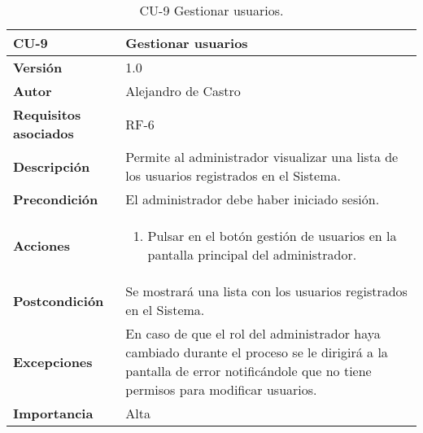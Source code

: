 \begin{table}[p]
	\centering
	\begin{tabularx}{\linewidth}{ p{} p{} }
		\toprule
		\textbf{CU-9}    & \textbf{Gestionar usuarios}\\
		\toprule
		\textbf{Versión}              & 1.0    \\
		\textbf{Autor}                & {Alejandro de Castro} \\
		\textbf{Requisitos asociados} & RF-6 \\
		\textbf{Descripción}          & Permite al administrador visualizar una lista de los usuarios registrados en el Sistema. \\
		\textbf{Precondición}         & El administrador debe haber iniciado sesión. \\
        \textbf{Acciones}             &
		\begin{enumerate}
			\def\labelenumi{\arabic{enumi}.}
			\tightlist
			\item Pulsar en el botón gestión de usuarios en la pantalla principal del administrador.
		\end{enumerate}\\ 
		\textbf{Postcondición}        & Se mostrará una lista con los usuarios registrados en el Sistema. \\
		\textbf{Excepciones}          & En caso de que el rol del administrador haya cambiado durante el proceso se le dirigirá a la pantalla de error notificándole que no tiene permisos para modificar usuarios. \\
		\textbf{Importancia}          & Alta \\
		\bottomrule
	\end{tabularx}
	\caption{CU-9 Gestionar usuarios.}
\end{table}

